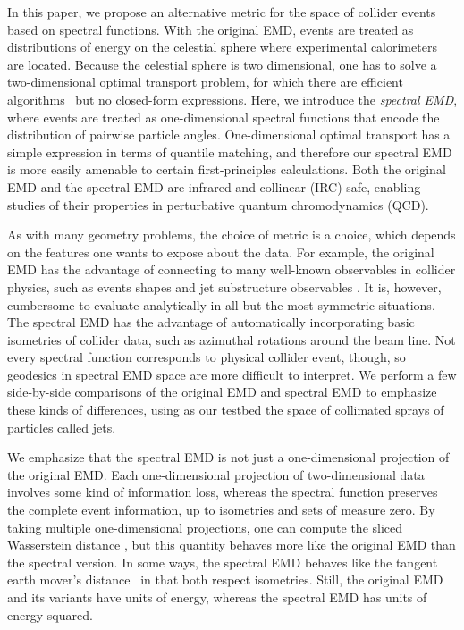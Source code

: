\documentclass[letterpaper,11pt]{article}
\begin{document}
In this paper, we propose an alternative metric for the space of collider events based on spectral functions.
%
With the original EMD, events are treated as distributions of energy on the celestial sphere where experimental calorimeters are located.
%
Because the celestial sphere is two dimensional, one has to solve a two-dimensional optimal transport problem, for which there are efficient algorithms~\cite{jacobi1890investigando,jacobi1890aequationum,kuhn1955hungarian} but no closed-form expressions.
%
Here, we introduce the \emph{spectral EMD}, where events are treated as one-dimensional spectral functions that encode the distribution of pairwise particle angles.
%
One-dimensional optimal transport has a simple expression in terms of quantile matching, and therefore our spectral EMD is more easily amenable to certain first-principles calculations.
%
Both the original EMD and the spectral EMD are infrared-and-collinear (IRC) safe, enabling studies of their properties in perturbative quantum chromodynamics (QCD).



As with many geometry problems, the choice of metric is a choice, which depends on the features one wants to expose about the data.
%
For example, the original EMD has the advantage of connecting to many well-known observables in collider physics, such as events shapes and jet substructure observables \cite{Komiske:2020qhg}.
%
It is, however, cumbersome to evaluate analytically in all but the most symmetric situations.
%
The spectral EMD has the advantage of automatically incorporating basic isometries of collider data, such as azimuthal rotations around the beam line.
%
Not every spectral function corresponds to physical collider event, though, so geodesics in spectral EMD space are more difficult to interpret.
%
We perform a few side-by-side comparisons of the original EMD and spectral EMD to emphasize these kinds of differences, using as our testbed the space of collimated sprays of particles called jets.


We emphasize that the spectral EMD is not just a one-dimensional projection of the original EMD.
%
Each one-dimensional projection of two-dimensional data involves some kind of information loss, whereas the spectral function preserves the complete event information, up to isometries and sets of measure zero.
%
By taking multiple one-dimensional projections, one can compute the sliced Wasserstein distance \cite{rabin2011wasserstein,bonneel2015sliced}, but this quantity behaves more like the original EMD than the spectral version.
%
In some ways, the spectral EMD behaves like the tangent earth mover's distance~\cite{10.1007/978-3-642-40020-9_43} in that both respect isometries.
%
Still, the original EMD and its variants have units of energy, whereas the spectral EMD has units of energy squared.
\end{document}
